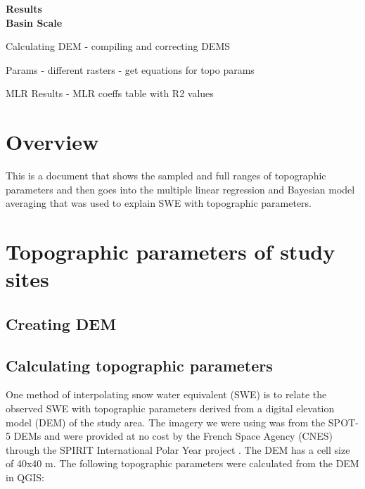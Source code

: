 \documentclass[12pt]{article}
\begin{document}

\begin{center}
\Large \textbf{Results\\ Basin Scale}
\end{center}

Calculating DEM
- compiling and correcting DEMS

Params
- different rasters
- get equations for topo params

MLR Results
- MLR coeffs table with R2 values


\section*{Overview}
This is a document that shows the sampled and full ranges of topographic parameters and then goes into the multiple linear regression and Bayesian model averaging that was used to explain SWE with topographic parameters. 

\tableofcontents
\pagebreak

\section{Topographic parameters of study sites}

\subsection{Creating DEM}

\subsection{Calculating topographic parameters}
One method of interpolating snow water equivalent (SWE) is to relate the observed SWE with topographic parameters derived from a digital elevation model (DEM) of the study area. The imagery we were using was from the SPOT-5 DEMs and were provided at no cost by the French Space Agency (CNES) through the SPIRIT International Polar Year project \citep{Korona2009}. The DEM has a cell size of 40x40 m. The following topographic parameters were calculated from the DEM in QGIS:
\end{document}
